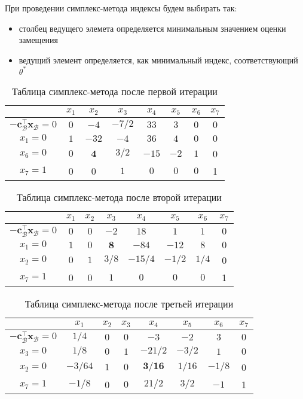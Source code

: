 \documentclass[12pt]{article}
\newcommand{\bx}{\mathbf{x}}
\begin{document}
При проведении симплекс-метода индексы будем выбирать так:
\begin{itemize}
\item столбец ведущего элемета определяется минимальным значением оценки замещения
\item ведущий элемент определяется, как минимальный индекс, соответствующий $\theta^*$
\end{itemize}

\newpage

\begin{table}[!ht]
\centering
\caption{Таблица симплекс-метода после первой итерации}
\begin{tabular}{|c|ccccccc|}
\hline
& $x_1$ & $x_2$ & $x_3$ & $x_4$ & $x_5$ & $x_6$ & $x_7$\\
\hline
$-\mathbf{c}_{\mathcal{B}}^{\top}\bx_{\mathcal{B}} = 0$ & $0$ & $-4$ & $-7/2$ & $33$ & $3$ & $0$ & $0$ \\
\hline
$x_1 = 0$ & $1$ & $-32$ & $-4$ & $36$ & $4$ & $0$ & $0$ \\
$x_6 = 0$ & $0$ & $\mathbf{4}$ & $3/2$ & $-15$ & $-2$ & $1$ & 0 \\
$x_7 = 1$ & 0 & 0 & $1$ & $0$ & $0$ & $0$ & 1 \\
\hline
\end{tabular}
\label{tab::simplex_21}
\end{table}

\begin{table}[!ht]
\centering
\caption{Таблица симплекс-метода после второй итерации}
\begin{tabular}{|c|ccccccc|}
\hline
& $x_1$ & $x_2$ & $x_3$ & $x_4$ & $x_5$ & $x_6$ & $x_7$\\
\hline
$-\mathbf{c}_{\mathcal{B}}^{\top}\bx_{\mathcal{B}} = 0$ & $0$ & $0$ & $-2$ & $18$ & $1$ & $1$ & $0$ \\
\hline
$x_1 = 0$ & $1$ & $0$ & $\mathbf{8}$ & $-84$ & $-12$ & $8$ & $0$ \\
$x_2 = 0$ & $0$ & $1$ & $3/8$ & $-15/4$ & $-1/2$ & $1/4$ & 0 \\
$x_7 = 1$ & 0 & 0 & $1$ & $0$ & $0$ & $0$ & 1 \\
\hline
\end{tabular}
\label{tab::simplex_22}
\end{table}

\begin{table}[!ht]
\centering
\caption{Таблица симплекс-метода после третьей итерации}
\begin{tabular}{|c|ccccccc|}
\hline
& $x_1$ & $x_2$ & $x_3$ & $x_4$ & $x_5$ & $x_6$ & $x_7$\\
\hline
$-\mathbf{c}_{\mathcal{B}}^{\top}\bx_{\mathcal{B}} = 0$ & $1/4$ & $0$ & $0$ & $-3$ & $-2$ & $3$ & $0$ \\
\hline
$x_3 = 0$ & $1/8$ & $0$ & $1$ & $-21/2$ & $-3/2$ & $1$ & $0$ \\
$x_2 = 0$ & $-3/64$ & $1$ & $0$ & $\mathbf{3/16}$ & $1/16$ & $-1/8$ & 0 \\
$x_7 = 1$ & $-1/8$ & 0 & $0$ & $21/2$ & $3/2$ & $-1$ & 1 \\
\hline
\end{tabular}
\label{tab::simplex_23}
\end{table}
\end{document}
